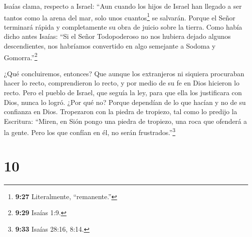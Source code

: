  Isaías clama, respecto a Israel: ``Aun cuando los hijos de
Israel han llegado a ser tantos como la arena del mar, solo unos
cuantos\footnote{\textbf{9:27} Literalmente, ``remanente.''} se
salvarán.  Porque el Señor terminará rápida y completamente
su obra de juicio sobre la tierra.  Como había dicho antes
Isaías: ``Si el Señor Todopoderoso no nos hubiera dejado algunos
descendientes, nos habríamos convertido en algo semejante a Sodoma y
Gomorra.''\footnote{\textbf{9:29} Isaías 1:9.}

 ¿Qué concluiremos, entonces? Que aunque los extranjeros ni
siquiera procuraban hacer lo recto, comprendieron lo recto, y por medio
de su fe en Dios hicieron lo recto.  Pero el pueblo de
Israel, que seguía la ley, para que ella los justificara con Dios, nunca
lo logró.  ¿Por qué no? Porque dependían de lo que hacían y
no de su confianza en Dios. Tropezaron con la piedra de tropiezo,
 tal como lo predijo la Escritura: ``Miren, en Sión pongo
una piedra de tropiezo, una roca que ofenderá a la gente. Pero los que
confían en él, no serán frustrados.''\footnote{\textbf{9:33} Isaías
  28:16, 8:14.}

\hypertarget{section-9}{%
\section{10}\label{section-9}}

